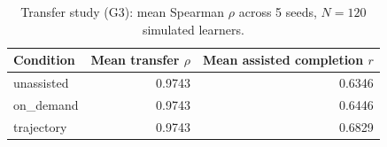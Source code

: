 \begin{table}[t]
\caption{Transfer study (G3): mean Spearman $\rho$ across 5 seeds, $N=120$ simulated learners.}
\label{tab:transfer}
\centering
\begin{tabular}{lrr}
\toprule
Condition & Mean transfer $\rho$ & Mean assisted completion $r$ \\
\midrule
unassisted & 0.9743 & 0.6346 \\
on\_demand & 0.9743 & 0.6446 \\
trajectory & 0.9743 & 0.6829 \\
\bottomrule
\end{tabular}
\end{table}
